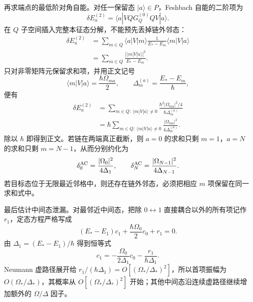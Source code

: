 \begin{derivation}
再求端点的最低阶对角自能。对任一保留态 $|a\rangle\in P$，Feshbach 自能的二阶项为
\begin{equation*}
 \delta E_a^{(2)}
 =\langle a|VQG_Q^{(0)}Q V|a\rangle.
\end{equation*}
在 $Q$ 子空间插入完整本征态分解，不能预先丢掉链外邻态：
\begin{align*}
 \delta E_a^{(2)}
 &=\sum_{m\in Q}
 \langle a|V|m\rangle
 \frac1{E_*-E_m}
 \langle m|V|a\rangle\\
 &=\sum_{m\in Q}
 \frac{|\langle m|V|a\rangle|^2}{E_*-E_m}.
\end{align*}
只对非零矩阵元保留求和项，并用正文记号
\begin{equation*}
 \langle m|V|a\rangle=\frac{\hbar\Omega_{ma}}2,
 \qquad
 \Delta_m^{(a)}=\frac{E_*-E_m}{\hbar},
\end{equation*}
便有
\begin{align*}
 \delta E_a^{(2)}
 &=\sum_{m\in Q:\,\langle m|V|a\rangle\ne0}
 \frac{\hbar^2|\Omega_{ma}|^2/4}{\hbar\Delta_m^{(a)}}\\
 &=\hbar
 \sum_{m\in Q:\,\langle m|V|a\rangle\ne0}
 \frac{|\Omega_{ma}|^2}{4\Delta_m^{(a)}}.
\end{align*}
除以 $\hbar$ 即得到正文。若链在两端真正截断，则 $a=0$ 的求和只剩 $m=1$，$a=N$ 的求和只剩 $m=N-1$，从而分别约化为
\begin{equation*}
 \delta_0^{\rm AC}=\frac{|\Omega_0|^2}{4\Delta_1},
 \qquad
 \delta_N^{\rm AC}=\frac{|\Omega_{N-1}|^2}{4\Delta_{N-1}}.
\end{equation*}
若目标态位于无限最近邻格中，则还存在链外邻态，必须把相应 $m$ 项保留在同一求和式中。

最后估计中间态泄漏。对最邻近中间态，把除 $0\leftrightarrow1$ 直接耦合以外的所有项记作 $r_1$，定态方程严格写成
\begin{equation*}
 (E_*-E_1)c_1
 +\frac{\hbar\Omega_0}{2}c_0+r_1=0.
\end{equation*}
由 $\Delta_1=(E_*-E_1)/\hbar$ 得到恒等式
\begin{equation*}
 c_1
 =-\frac{\Omega_0}{2\Delta_1}c_0
 -\frac{r_1}{\hbar\Delta_1}.
\end{equation*}
Neumann 虚路径展开给 $r_1/(\hbar\Delta_1)=O[(\Omega_*/\Delta_*)^2]$，所以首项振幅为 $O(\Omega_*/\Delta_*)$，其概率从 $O[(\Omega_*/\Delta_*)^2]$ 开始；其他中间态沿连续虚路径继续增加额外的 $\Omega/\Delta$ 因子。
\end{derivation}
